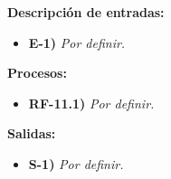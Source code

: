 \textbf{Descripci\'on de entradas:}
\begin{itemize}[label={}, leftmargin=1.5em]
  \item \textbf{E-1)} \textit{Por definir.}
\end{itemize}

\textbf{Procesos:}
\begin{itemize}[label={}, leftmargin=1.5em]
  \item \textbf{RF-11.1)} \textit{Por definir.}
\end{itemize}

\textbf{Salidas:}
\begin{itemize}[label={}, leftmargin=1.5em]
  \item \textbf{S-1)} \textit{Por definir.}
\end{itemize}

